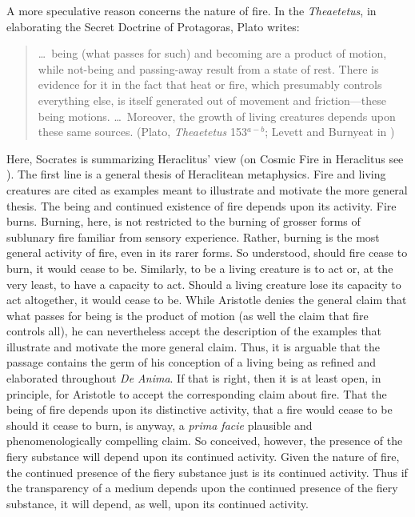 A more speculative reason concerns the nature of fire. In the \emph{Theaetetus}, in elaborating the Secret Doctrine of Protagoras, Plato writes:
\begin{quote}
	\ldots\ being (what passes for such) and becoming are a product of motion, while not-being and passing-away result from a state of rest. There is evidence for it in the fact that heat or fire, which presumably controls everything else, is itself generated out of movement and friction---these being motions. \ldots\ Moreover, the growth of living creatures depends upon these same sources. (Plato, \emph{Theaetetus} 153\( ^{a-b} \); Levett and Burnyeat in \citealt[70]{Cooper:1997fk})
\end{quote}
Here, Socrates is summarizing Heraclitus' view (on Cosmic Fire in Heraclitus see \citealt{Wiggins:1982kx}). The first line is a general thesis of Heraclitean metaphysics. Fire and living creatures are cited as examples meant to illustrate and motivate the more general thesis. The being and continued existence of fire depends upon its activity. Fire burns. Burning, here, is not restricted to the burning of grosser forms of sublunary fire familiar from sensory experience. Rather, burning is the most general activity of fire, even in its rarer forms. So understood, should fire cease to burn, it would cease to be. Similarly, to be a living creature is to act or, at the very least, to have a capacity to act. Should a living creature lose its capacity to act altogether, it would cease to be. While Aristotle denies the general claim that what passes for being is the product of motion (as well the claim that fire controls all), he can nevertheless accept the description of the examples that illustrate and motivate the more general claim. Thus, it is arguable that the passage contains the germ of his conception of a living being as refined and elaborated throughout \emph{De Anima}. If that is right, then it is at least open, in principle, for Aristotle to accept the corresponding claim about fire. That the being of fire depends upon its distinctive activity, that a fire would cease to be should it cease to burn, is anyway, a \emph{prima facie} plausible and phenomenologically compelling claim. So conceived, however, the presence of the fiery substance will depend upon its continued activity. Given the nature of fire, the continued presence of the fiery substance just is its continued activity. Thus if the transparency of a medium depends upon the continued presence of the fiery substance, it will depend, as well, upon its continued activity. 

